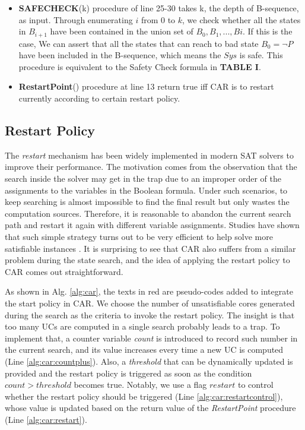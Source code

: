 \begin{itemize}
    \item \textbf{SAFECHECK}(k) procedure of line 25-30 takes k, the depth of B-sequence, as input. Through enumerating $i$ from $0$ to $k$, we check whether all the states in $B_{i+1}$ have been contained in the union set of $B_{0},B_{1},...,B{i}$. If this is the case, We can assert that all the states that can reach to bad state $B_{0}=\neg P$ have been included in the B-sequence, which means the $Sys$ is safe. This procedure is equivalent to the Safety Check formula in \textbf{TABLE I}.
    \item \textbf{RestartPoint}() procedure at line 13 return true iff CAR is to restart currently according to certain restart policy.
    \fi
\end{itemize}

\subsection{Restart Policy}

The \emph{restart} mechanism has been widely implemented in modern SAT solvers to improve their performance. The motivation comes from the observation that the search inside the solver may get in the trap due to an improper order of the assignments to the variables in the Boolean formula. Under such scenarios, to keep searching is almost impossible to find the final result  but only wastes the computation sources. Therefore, it is reasonable to abandon the current search path and restart it again with different variable assignments. Studies have shown that such simple strategy turns out to be very efficient to help solve more satisfiable instances \cite{Biere08}. It is surprising to see that CAR also suffers from a similar problem during the state search, and the idea of applying the restart policy to CAR comes out straightforward.

As shown in Alg. \ref{alg:car}, the texts in red are pseudo-codes added to integrate the start policy in CAR. We choose the number of unsatisfiable cores generated during the search as the criteria to invoke the restart policy. The insight is that too many UCs are computed in a single search probably leads to a trap. To implement that, a counter variable \emph{count} is introduced to record such number in the current search, and its value increases every time a new UC is computed (Line \ref{alg:car:countplus}). Also, a \emph{threshold} that can be dynamically updated is provided  and the restart policy is triggered as soon as the condition $count > threshold$ becomes true. Notably, we use a flag $restart$ to control whether the restart policy should be triggered (Line \ref{alg:car:restartcontrol}), whose value is updated based on the return value of the \emph{RestartPoint} procedure (Line \ref{alg:car:restart}).

